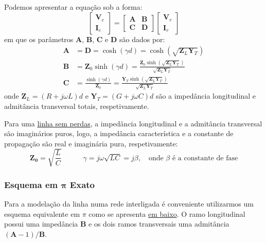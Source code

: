 Podemos apresentar a equação sob a forma:
$$
    \begin{bmatrix}
        \mathbf{V}_e \\[6pt]
        \mathbf{I}_e
    \end{bmatrix}
    =
    \begin{bmatrix}
        \mathbf{A} & \mathbf{B} \\[6pt]
        \mathbf{C} & \mathbf{D}
    \end{bmatrix}
    \begin{bmatrix}
        \mathbf{V}_r \\[6pt]
        \mathbf{I}_r
    \end{bmatrix}
$$
em que os parâmetros $\mathbf{A}$, $\mathbf{B}$, $\mathbf{C}$ e $\mathbf{D}$ são dados por:
$$
    \begin{aligned}
        \mathbf{A} &= \mathbf{D} = \cosh(\gamma d) = \cosh(\sqrt{\mathbf{Z}_L \mathbf{Y}_T}) \\[1pt]
        \mathbf{B} &= \mathbf{Z}_0 \sinh(\gamma d) = \frac{\mathbf{Z}_0 \sinh(\sqrt{\mathbf{Z}_L \mathbf{Y}_T})}{\sqrt{\mathbf{Z}_L \mathbf{Y}_T}} \\[1pt]
        \mathbf{C} &= \frac{\sinh(\gamma d)}{\mathbf{Z}_0} = \frac{\mathbf{Y}_T \sinh(\sqrt{\mathbf{Z}_L \mathbf{Y}_T})}{\sqrt{\mathbf{Z}_L \mathbf{Y}_T}}
    \end{aligned}
$$
onde $\mathbf{Z}_L = (R + j\omega L)d$ e $\mathbf{Y}_T = (G + j\omega C)d$ são a impedância longitudinal e admitância transversal totais, respetivamente.

\begin{mdframed}
    Para uma \underline{linha sem perdas}, a impedância longitudinal e a admitância transversal são imaginários puros, logo, a impedância característica e a constante de propagação são real e imaginária pura, respetivamente:
    $$
        \mathbf{Z_0} = \sqrt{\dfrac{L}{C}}
        \qquad\quad
        \gamma = j\omega\sqrt{LC} = j\beta, \quad \text{onde $\beta$ é a constante de fase}
    $$
\end{mdframed}

\subsubsection{Esquema em $\pmb{\pi}$ Exato}

Para a modelação da linha numa rede interligada é conveniente utilizarmos um esquema equivalente em $\pi$ como se apresenta \hyperref[fig:linha-transmissao-esq-exato]{em baixo}. O ramo longitudinal possui uma impedância $\mathbf{B}$ e os dois ramos transversais uma admitância $(\mathbf{A}-1)/\mathbf{B}$.

